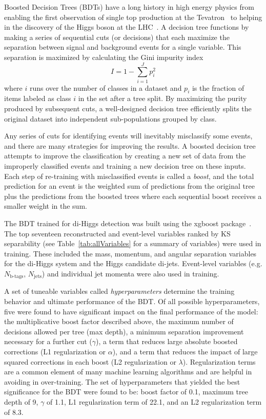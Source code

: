 \label{sec:BDT}
Boosted Decision Trees (BDTs) have a long history in high energy physics from enabling the first observation of single top production at the Tevatron~\cite{Abazov:2006gd, Aaltonen:2008sy} to helping in the discovery of the Higgs boson at the LHC~\cite{Aad_2012, Chatrchyan_2012}. A decision tree functions by making a series of sequential cuts (or decisions) that each maximize the separation between signal and background events for a single variable. This separation is maximized by calculating the Gini impurity index
\begin{equation*}
I = 1 - \sum_{i=1}^{J} p_i^2
\end{equation*}
where $i$ runs over the number of classes in a dataset and $p_i$ is the fraction of items labeled as class $i$ in the set after a tree split. By maximizing the purity produced by subsequent cuts, a well-designed decision tree efficiently splits the original dataset into independent sub-populations grouped by class.

Any series of cuts for identifying events will inevitably misclassify some events, and there are many strategies for improving the results. A boosted decision tree attempts to improve the classification by creating a new set of data from the improperly classified events and training a new decision tree on these inputs. Each step of re-training with misclassified events is called a \textit{boost}, and the total prediction for an event is the weighted sum of predictions from the original tree plus the predictions from the boosted trees where each sequential boost receives a smaller weight in the sum.

The BDT trained for di-Higgs detection was built using the xgboost package~\cite{xgboost}. The top seventeen reconstructed and event-level variables ranked by KS separability (see Table~\ref{tab:allVariables} for a summary of variables) were used in training. These included the mass, momentum, and angular separation variables for the di-Higgs system and the Higgs candidate di-jets. Event-level variables (e.g. $N_{\textrm{b-tags}}$, $N_{\textrm{jets}}$) and individual jet momenta were also used in training.

A set of tuneable variables called \textit{hyperparameters} determine the training behavior and ultimate performance of the BDT. Of all possible hyperparameters, five were found to have significant impact on the final performance of the model: the multiplicative boost factor described above, the maximum number of decisions allowed per tree (max depth), a minimum separation improvement necessary for a further cut ($\gamma$), a term that reduces large absolute boosted corrections (L1 regularization or $\alpha$), and a term that reduces the impact of large squared corrections in each boost (L2 regularization or $\lambda$). Regularization terms are a common element of many machine learning algorithms and are helpful in avoiding in over-training. The set of hyperparameters that yielded the best significance for the BDT were found to be: boost factor of 0.1, maximum tree depth of 9, $\gamma$ of 1.1, L1 regularization term of 22.1, and an L2 regularization term of 8.3.

